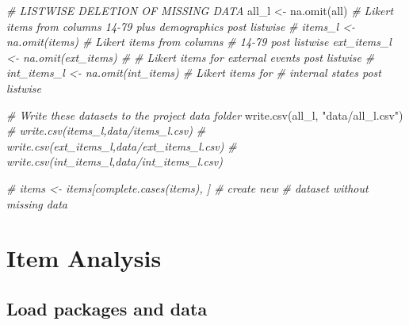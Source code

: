 \documentclass[
]{report}
\newenvironment{Shaded}{\begin{snugshade}}{\end{snugshade}}
\newcommand{\CommentTok}[1]{\textcolor[rgb]{0.56,0.35,0.01}{\textit{#1}}}
\newcommand{\FunctionTok}[1]{\textcolor[rgb]{0.00,0.00,0.00}{#1}}
\newcommand{\NormalTok}[1]{#1}
\newcommand{\OtherTok}[1]{\textcolor[rgb]{0.56,0.35,0.01}{#1}}
\newcommand{\StringTok}[1]{\textcolor[rgb]{0.31,0.60,0.02}{#1}}
\begin{document}
\begin{Shaded}
\begin{Highlighting}[]
\CommentTok{\# LISTWISE DELETION OF MISSING DATA}
\NormalTok{all\_l }\OtherTok{\textless{}{-}} \FunctionTok{na.omit}\NormalTok{(all)  }\CommentTok{\#  Likert items from columns 14{-}79 plus demographics post listwise}
\CommentTok{\# items\_l \textless{}{-} na.omit(items) \# Likert items from columns}
\CommentTok{\# 14{-}79 post listwise ext\_items\_l \textless{}{-} na.omit(ext\_items) \#}
\CommentTok{\# Likert items for external events post listwise}
\CommentTok{\# int\_items\_l \textless{}{-} na.omit(int\_items) \# Likert items for}
\CommentTok{\# internal states post listwise}

\CommentTok{\# Write these datasets to the project data folder}
\FunctionTok{write.csv}\NormalTok{(all\_l, }\StringTok{"data/all\_l.csv"}\NormalTok{)}
\CommentTok{\# write.csv(items\_l,\textquotesingle{}data/items\_l.csv\textquotesingle{})}
\CommentTok{\# write.csv(ext\_items\_l,\textquotesingle{}data/ext\_items\_l.csv\textquotesingle{})}
\CommentTok{\# write.csv(int\_items\_l,\textquotesingle{}data/int\_items\_l.csv\textquotesingle{})}

\CommentTok{\# items \textless{}{-} items[complete.cases(items), ] \# create new}
\CommentTok{\# dataset without missing data}
\end{Highlighting}
\end{Shaded}

\hypertarget{item-analysis}{%
\chapter{Item Analysis}\label{item-analysis}}

\hypertarget{load-packages-and-data}{%
\section{Load packages and data}\label{load-packages-and-data}}
\end{document}

